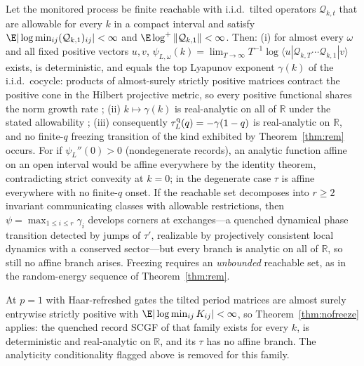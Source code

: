 \begin{theorem}
\label{thm:nofreeze}
Let the monitored process be finite reachable with i.i.d.\ tilted
operators $\mathcal Q_{k,t}$ that are allowable for every $k$ in a compact
interval and satisfy $\E|\log\min_{ij}(\mathcal Q_{k,1})_{ij}|<\infty$ and
$\E\log^+\|\mathcal Q_{k,1}\|<\infty$.  Then:
(i) for almost every $\omega$ and all fixed positive vectors $u,v$,
$\psi_{L,\omega}(k)=\lim_{T\to\infty}T^{-1}\log\langle
u|\mathcal Q_{k,T}\cdots\mathcal Q_{k,1}|v\rangle$ exists, is
deterministic, and equals the top Lyapunov exponent $\gamma(k)$ of the
i.i.d.\ cocycle: products of almost-surely strictly positive matrices
contract the positive cone in the Hilbert projective metric, so every
positive functional shares the norm growth rate
\cite{FurstenbergKesten1960};
(ii) $k\mapsto\gamma(k)$ is real-analytic on all of $\mathbb R$ under the
stated allowability \cite{LePage1974,Ruelle1979,Peres1992};
(iii) consequently $\tau_L^{\rm q}(q)=-\gamma(1-q)$ is real-analytic on
$\mathbb R$, and no finite-$q$ freezing transition of the kind exhibited
by Theorem~\ref{thm:rem} occurs.  For if $\psi_L''(0)>0$ (nondegenerate
records), an analytic function affine on an open interval would be affine
everywhere by the identity theorem, contradicting strict convexity at
$k=0$; in the degenerate case $\tau$ is affine everywhere with no
finite-$q$ onset.  If the reachable set decomposes into $r\ge2$ invariant
communicating classes with allowable restrictions, then
$\psi=\max_{1\le i\le r}\gamma_i$ develops corners at exchanges---a
quenched dynamical phase transition detected by jumps of $\tau'$, realizable
by projectively consistent local dynamics with a conserved sector---but
every branch is analytic on all of $\mathbb R$, so still no affine branch
arises.  Freezing requires an \emph{unbounded} reachable set, as in the
random-energy sequence of Theorem~\ref{thm:rem}.
\end{theorem}

\begin{corollary}
\label{cor:p1closure}
At $p=1$ with Haar-refreshed gates the tilted period matrices are almost
surely entrywise strictly positive with
$\E|\log\min_{ij}K_{ij}|<\infty$, so
Theorem~\ref{thm:nofreeze} applies: the quenched record SCGF of that
family exists for every $k$, is deterministic and real-analytic on
$\mathbb R$, and its $\tau$ has no affine branch.  The analyticity
conditionality flagged above is removed for this family.
\end{corollary}

